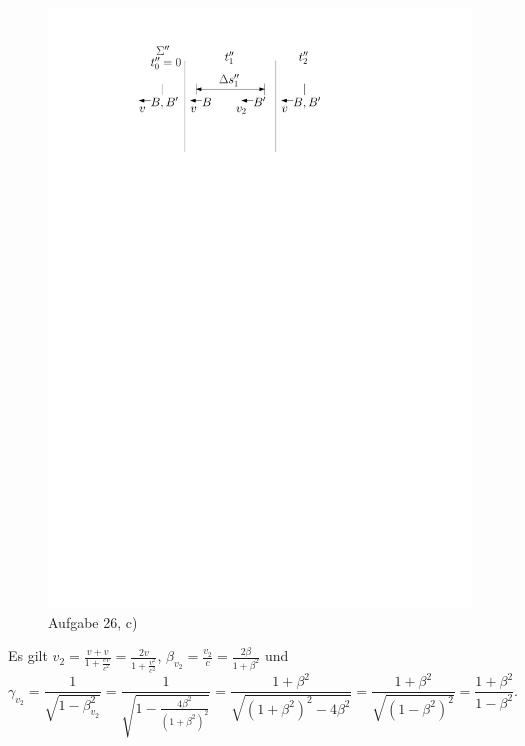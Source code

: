 \begin{figure}[h]
	\centering
	\includegraphics{figures/ueb12/aufgabe26}
	\caption{Aufgabe 26, c)}
	\label{fig:ueb12_aufgabe26}
\end{figure}

Es gilt $v_2 = \frac{v + v}{1 + \frac{v v}{c^2}} = \frac{2 v}{1 + \frac{v^2}{c^2}}$, $\beta_{v_2} = \frac{v_2}{c} = \frac{2 \beta}{1 + \beta^2}$ und 
\[
	\gamma_{v_2} = \frac{1}{\sqrt{1 - \beta^2_{v_2}}} = \frac{1}{\sqrt{1 - \frac{4 \beta^2}{(1 + \beta^2)^2}}} = \frac{1 + \beta^2}{\sqrt{(1 + \beta^2)^2 - 4 \beta^2}} 
	= \frac{1 + \beta^2}{\sqrt{(1 - \beta^2)^2}} = \frac{1 + \beta^2}{1 - \beta^2}
	\text{.}
\]

